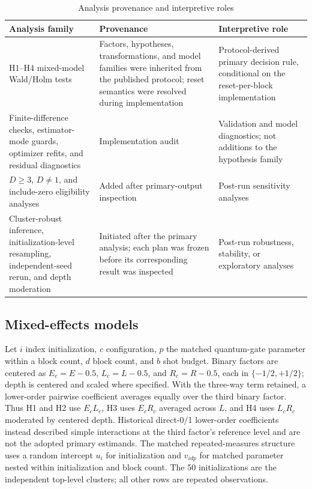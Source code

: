 \documentclass[pdflatex,sn-basic,Numbered]{sn-jnl}
\begin{document}
\begin{table}[t]
\centering
\small
\begin{tabularx}{\textwidth}{@{}p{}p{}X@{}}
\toprule
Analysis family & Provenance & Interpretive role \\
\midrule
H1--H4 mixed-model Wald/Holm tests & Factors, hypotheses, transformations, and model families were inherited from the published protocol; reset semantics were resolved during implementation & Protocol-derived primary decision rule, conditional on the reset-per-block implementation \\
Finite-difference checks, estimator-mode guards, optimizer refits, and residual diagnostics & Implementation audit & Validation and model diagnostics; not additions to the hypothesis family \\
$D\geq3$, $D\neq1$, and include-zero eligibility analyses & Added after primary-output inspection & Post-run sensitivity analyses \\
Cluster-robust inference, initialization-level resampling, independent-seed rerun, and depth moderation & Initiated after the primary analysis; each plan was frozen before its corresponding result was inspected & Post-run robustness, stability, or exploratory analyses \\
\bottomrule
\end{tabularx}
\caption{Analysis provenance and interpretive roles}
\label{tab:analysis-provenance}
\end{table}

\subsection{Mixed-effects models}

Let $i$ index initialization, $c$ configuration, $p$ the matched quantum-gate parameter within a block count, $d$ block count, and $b$ shot budget. Binary factors are centered as $E_c=E-0.5$, $L_c=L-0.5$, and $R_c=R-0.5$, each in $\{-1/2,+1/2\}$; depth is centered and scaled where specified. With the three-way term retained, a lower-order pairwise coefficient averages equally over the third binary factor. Thus H1 and H2 use $E_cL_c$, H3 uses $E_cR_c$ averaged across $L$, and H4 uses $L_cR_c$ moderated by centered depth. Historical direct-0/1 lower-order coefficients instead described simple interactions at the third factor's reference level and are not the adopted primary estimands. The matched repeated-measures structure uses a random intercept $u_i$ for initialization and $v_{idp}$ for matched parameter nested within initialization and block count. The 50 initializations are the independent top-level clusters; all other rows are repeated observations.
\end{document}
